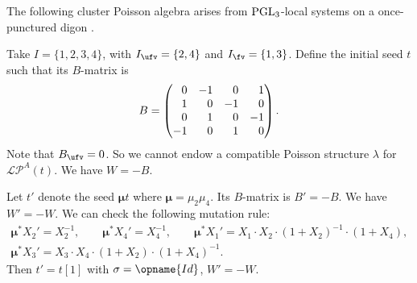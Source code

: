 \documentclass[pdftex]{sigma}
\newcommand{\Iufv}{I_{\ufv}}
\newcommand{\Ifv}{I_{\fv}}
\newcommand{\LP}{{\mathcal{LP}}}
\newcommand{\Id}{{\opname{Id}}}
\newcommand{\seq}{\boldsymbol{\mu}}%
\numberwithin{equation}{section}
\begin{document}
\begin{Example}
The following cluster Poisson algebra arises from ${\rm PGL}_{3}$-local
systems on a once-punctured digon \cite{schrader2019cluster}.

Take $I=\{1,2,3,4\}$, with $\Iufv=\{2,4\}$ and $\Ifv=\{1,3\}$.
Define the initial seed $t$ such that its $B$-matrix is \[B=\begin{pmatrix}
\hphantom{-}0 & -1 & \hphantom{-}0 & \hphantom{-}1\\
\hphantom{-}1 & \hphantom{-}0 & -1 & \hphantom{-}0\\
\hphantom{-}0 & \hphantom{-}1 & \hphantom{-}0 & -1\\
-1 & \hphantom{-}0 & \hphantom{-}1 & \hphantom{-}0
\end{pmatrix}.\] Note that $B_{\ufv}=0$. So we cannot endow a compatible Poisson
structure $\lambda$ for $\LP^{A}(t)$. We have $W=-B$.

Let $t'$ denote the seed $\seq t$ where $\seq=\mu_{2}\mu_{4}$.
Its $B$-matrix is $B'=-B$. We have $W'=-W$. We can check the following
mutation rule:
\begin{gather*}
\seq^{*}X_{2}' =X_{2}^{-1},\qquad
\seq^{*}X_{4}' =X_{4}^{-1},\qquad
\seq^{*}X_{1}' =X_{1}\cdot X_{2}\cdot(1+X_{2})^{-1}\cdot(1+X_{4}),\\
\seq^{*}X_{3}' =X_{3}\cdot X_{4}\cdot(1+X_{2})\cdot(1+X_{4})^{-1}.
\end{gather*}
Then $t'=t[1]$ with $\sigma=\Id$, $W'=-W$.


\end{Example}
\end{document}
